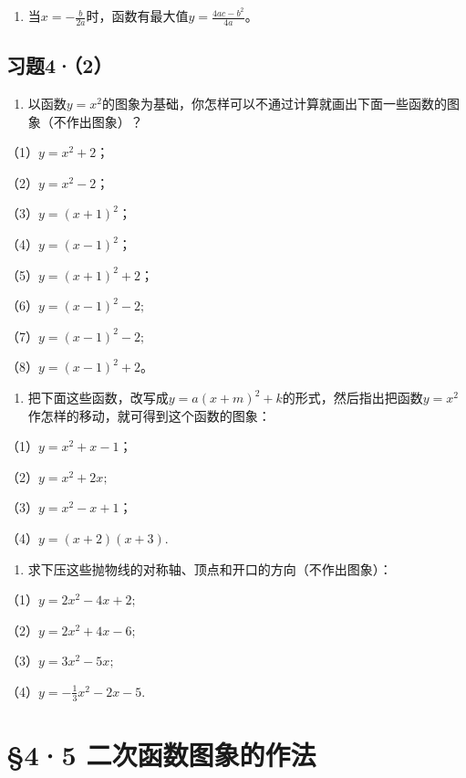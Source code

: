 \begin{enumerate}[start=2]
\item
  当\(x = -\frac{b}{2a}\)时，函数有最大值\(y = \frac{4ac - b^2}{4a}\)。
\end{enumerate}

\subsection{习题4·（2）}

\begin{enumerate}
\item
  以函数\(y = x^2\)的图象为基础，你怎样可以不通过计算就画出下面一些函数的图象（不作出图象）？
\end{enumerate}

（1）\(y = x^2 + 2\)；

（2）\(y = x^{2} - 2\)；

（3）\(y = (x + 1)^2\)；

（4）\(y = (x - 1)^2\)；

（5）\(y = (x + 1)^2 + 2\)；

（6）\(y = (x - 1)^{2} - 2;\)

（7）\(y = (x - 1)^2 - 2;\)

（8）\(y = (x - 1)^{2} + 2\)。

\begin{enumerate}[start=2]
\item
  把下面这些函数，改写成\(y = a(x + m)^2 + k\)的形式，然后指出把函数\(y = x^2\)作怎样的移动，就可得到这个函数的图象：
\end{enumerate}

（1）\(y = x^{2} + x - 1\)；

（2）\(y = x^{2} + 2x;\)

（3）\(y = x^{2} - x + 1\)；

（4）\(y = (x + 2)(x + 3).\)

\begin{enumerate}[start=3]
\item
  求下压这些抛物线的对称轴、顶点和开口的方向（不作出图象）：
\end{enumerate}

（1）\(y = 2x^{2} - 4x + 2;\)

（2）\(y = 2x^{2} + 4x - 6;\)

（3）\(y = 3x^{2} - 5x;\)

（4）\(y = -\frac{1}{3} x^2 - 2x - 5.\)

\section{§4·5 二次函数图象的作法}

